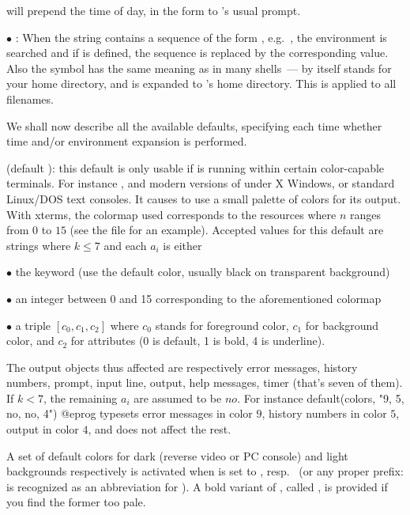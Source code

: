 
\noindent
will prepend the time of day, in the form 
to 's usual prompt.

$\bullet$ : When the string contains a sequence of
the form , e.g.~, the environment is
searched and if  is defined, the sequence is replaced by the
corresponding value. Also the \kbd{\til} symbol has the same meaning as in
many shells~--- \kbd{\til} by itself stands for your home directory, and
 is expanded to 's home directory. This is applied
to all filenames. \label{se:envir}

We shall now describe all the available defaults, specifying each time
whether time and/or environment expansion is performed.

 (default ): this default is only usable if
\label{se:colors}
is running within certain color-capable terminals. For instance ,
 and modern versions of  under X Windows, or
standard Linux/DOS text consoles. It causes  to use a small palette of
colors for its output. With xterms, the colormap used corresponds to the
resources  where $n$ ranges from $0$ to $15$ (see the
file  for an example). Accepted values for this
default are strings  where $k\le7$ and each
$a_i$ is either

\noindent $\bullet$ the keyword  (use the default color, usually
black on transparent background)

\noindent $\bullet$ an integer between 0 and 15 corresponding to the
aforementioned colormap

\noindent $\bullet$ a triple $[c_0,c_1,c_2]$ where $c_0$ stands for foreground
color, $c_1$ for background color, and $c_2$ for attributes (0 is default, 1
is bold, 4 is underline).

The output objects thus affected are respectively error messages,
history numbers, prompt, input line, output, help messages, timer (that's
seven of them). If $k < 7$, the remaining $a_i$ are assumed to be $no$. For
instance
%
\bprog
default(colors, "9, 5, no, no, 4")
@eprog
\noindent
typesets error messages in color $9$, history numbers in color $5$, output in
color $4$, and does not affect the rest.

A set of default colors for dark (reverse video or PC console) and light
backgrounds respectively is activated when  is set to
, resp.~ (or any proper prefix:  is
recognized as an abbreviation for ). A bold variant of
, called , is provided if you find the former too
pale.

